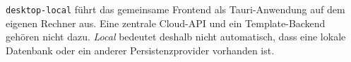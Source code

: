 \begin{beginnerstatement}

\texttt{desktop-local} führt das gemeinsame Frontend als Tauri-Anwendung auf
dem eigenen Rechner aus. Eine zentrale Cloud-API und ein Template-Backend
gehören nicht dazu. \emph{Local} bedeutet deshalb nicht automatisch, dass eine
lokale Datenbank oder ein anderer Persistenzprovider vorhanden ist.

\end{beginnerstatement}
